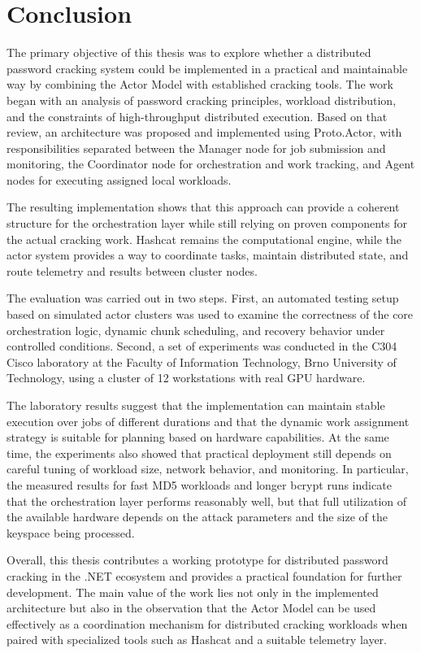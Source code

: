 \chapter{Conclusion}
\label{chap:conclusion}


The primary objective of this thesis was to explore whether a distributed password cracking system could be implemented in a practical and maintainable way by combining the Actor Model with established cracking tools. The work began with an analysis of password cracking principles, workload distribution, and the constraints of high-throughput distributed execution. Based on that review, an architecture was proposed and implemented using Proto.Actor, with responsibilities separated between the Manager node for job submission and monitoring, the Coordinator node for orchestration and work tracking, and Agent nodes for executing assigned local workloads.

The resulting implementation shows that this approach can provide a coherent structure for the orchestration layer while still relying on proven components for the actual cracking work. Hashcat remains the computational engine, while the actor system provides a way to coordinate tasks, maintain distributed state, and route telemetry and results between cluster nodes.

The evaluation was carried out in two steps. First, an automated testing setup based on simulated actor clusters was used to examine the correctness of the core orchestration logic, dynamic chunk scheduling, and recovery behavior under controlled conditions. Second, a set of experiments was conducted in the C304 Cisco laboratory at the Faculty of Information Technology, Brno University of Technology, using a cluster of 12 workstations with real GPU hardware.

The laboratory results suggest that the implementation can maintain stable execution over jobs of different durations and that the dynamic work assignment strategy is suitable for planning based on hardware capabilities. At the same time, the experiments also showed that practical deployment still depends on careful tuning of workload size, network behavior, and monitoring. In particular, the measured results for fast MD5 workloads and longer bcrypt runs indicate that the orchestration layer performs reasonably well, but that full utilization of the available hardware depends on the attack parameters and the size of the keyspace being processed.

Overall, this thesis contributes a working prototype for distributed password cracking in the .NET ecosystem and provides a practical foundation for further development. The main value of the work lies not only in the implemented architecture but also in the observation that the Actor Model can be used effectively as a coordination mechanism for distributed cracking workloads when paired with specialized tools such as Hashcat and a suitable telemetry layer.
